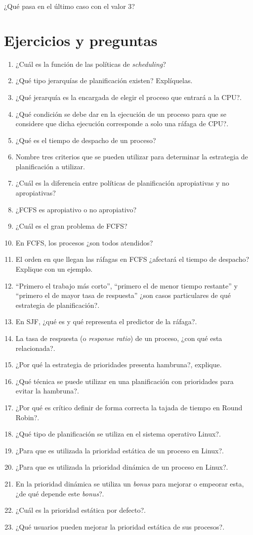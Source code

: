 ¿Qué pasa en el último caso con el valor 3?

\section{Ejercicios y preguntas}
\begin{enumerate}
\item ¿Cuál es la función de las políticas de \textit{scheduling}?
\item ¿Qué tipo jerarquías de planificación existen? Explíquelas.
\item ¿Qué jerarquía es la encargada de elegir el proceso que entrará a la CPU?.
\item ¿Qué condición se debe dar en la ejecución de un proceso para que se
considere que dicha ejecución corresponde a solo una ráfaga de CPU?.
\item ¿Qué es el tiempo de despacho de un proceso?
\item Nombre tres criterios que se pueden utilizar para determinar la estrategia
de planificación a utilizar.
\item ¿Cuál es la diferencia entre políticas de planificación apropiativas y no
apropiativas?
\item ¿FCFS es apropiativo o no apropiativo?
\item ¿Cuál es el gran problema de FCFS?
\item En FCFS, los procesos ¿son todos atendidos?
\item El orden en que llegan las ráfagas en FCFS ¿afectará el tiempo de
despacho? Explique con un ejemplo.
\item ``Primero el trabajo más corto'', ``primero el de menor tiempo restante''
y ``primero el de mayor tasa de respuesta'' ¿son casos particulares de qué
estrategia de planificación?.
\item En SJF, ¿qué es y qué representa el predictor de la ráfaga?.
\item La tasa de respuesta (o \textit{response ratio}) de un proceso, ¿con qué
esta relacionada?.
\item ¿Por qué la estrategia de prioridades presenta hambruna?, explique.
\item ¿Qué técnica se puede utilizar en una planificación con prioridades para
evitar la hambruna?.
\item ¿Por qué es crítico definir de forma correcta la tajada de tiempo en Round
Robin?.
\item ¿Qué tipo de planificación se utiliza en el sistema operativo Linux?.
\item ¿Para que es utilizada la prioridad estática de un proceso en Linux?.
\item ¿Para que es utilizada la prioridad dinámica de un proceso en Linux?.
\item En la prioridad dinámica se utiliza un \textit{bonus} para mejorar o
empeorar esta, ¿de qué depende este \textit{bonus}?.
\item ¿Cuál es la prioridad estática por defecto?.
\item ¿Qué usuarios pueden mejorar la prioridad estática de sus procesos?.
\end{enumerate}

